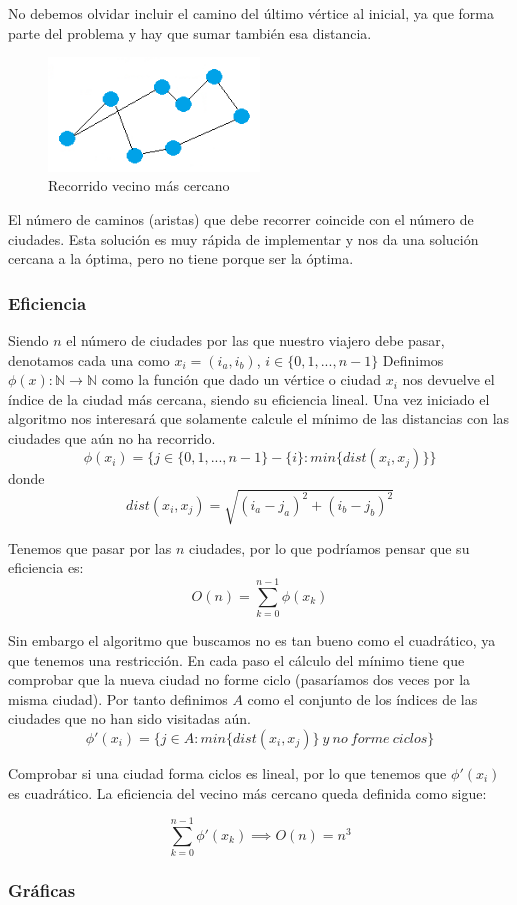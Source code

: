 No debemos olvidar incluir el camino del último vértice al inicial, ya que forma parte del problema y hay que sumar también esa distancia.

\begin{figure}[htbH] 
	\centering
	\includegraphics[width=0.5\textwidth]{./Imagenes/vecino8.png}
	\caption{Recorrido vecino más cercano} 
\end{figure}

El número de caminos (aristas) que debe recorrer coincide con el número de ciudades.
Esta solución es muy rápida de implementar y nos da una solución cercana a la óptima, pero no tiene porque ser la óptima.

\newpage


\newpage
\subsubsection{Eficiencia}
Siendo $n$ el número de ciudades por las que nuestro viajero debe pasar, denotamos cada una como $x_i=(i_a, i_b)$, $i\in\{0,1,...,n-1\}$
Definimos $\phi (x):\mathbb{N} \rightarrow \mathbb{N}$ como la función que dado un vértice o ciudad $x_i$ nos devuelve el 
índice de la ciudad más cercana, siendo su eficiencia lineal. Una vez iniciado el algoritmo nos interesará que solamente calcule
el mínimo de las distancias con las ciudades que aún no ha recorrido.
\[\phi (x_i) = \{j \in\{0,1,...,n-1\}-\{i\} : min\{dist(x_i, x_j)\} \}\]
donde 
\[ dist(x_i, x_j) = \sqrt{(i_a-j_a)^2+(i_b-j_b)^2} \]

Tenemos que pasar por las $n$ ciudades, por lo que podríamos pensar que su eficiencia es:
\[O(n) = \sum_{k=0}^{n-1} \phi (x_k)  \]

Sin embargo el algoritmo que buscamos no es tan bueno como el cuadrático, ya que tenemos una restricción. En cada paso el cálculo
del mínimo tiene que comprobar que la nueva ciudad no forme ciclo (pasaríamos dos veces por la misma ciudad).
Por tanto definimos $A$ como el conjunto de los índices de las ciudades que no han sido visitadas aún.
\[\phi '(x_i) = \{j \in A : min\{dist(x_i, x_j)\} \ y \ no \ forme \ ciclos \}\]

Comprobar si una ciudad forma ciclos es lineal, por lo que tenemos que $\phi '(x_i)$ es cuadrático.
La eficiencia del vecino más cercano queda definida como sigue:

\[ \sum_{k=0}^{n-1}\phi ' (x_k) \implies O(n) = n^3\]

\subsubsection{Gráficas}



